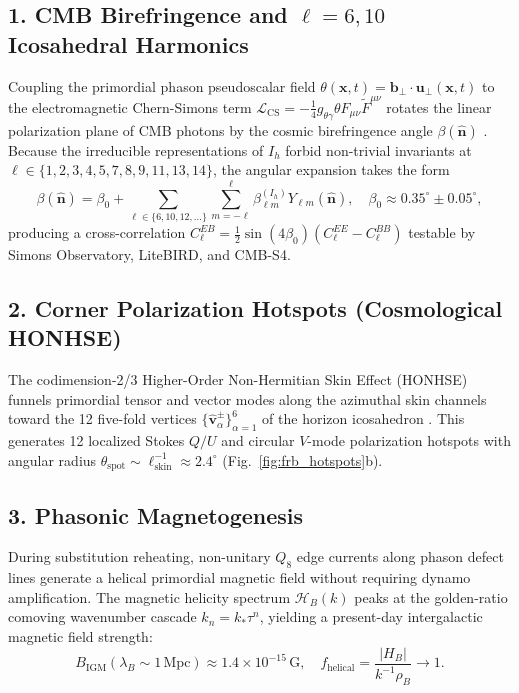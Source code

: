 \documentclass[aps,prd,twocolumn,superscriptaddress,nofootinbib]{revtex4-2}
\begin{document}
\subsection{1. CMB Birefringence and $\ell = 6, 10$ Icosahedral Harmonics}
Coupling the primordial phason pseudoscalar field $\theta(\bm{x}, t) = \bm{b}_\perp \cdot \bm{u}_\perp(\bm{x}, t)$ to the electromagnetic Chern-Simons term $\mathcal{L}_{\mathrm{CS}} = -\frac{1}{4} g_{\theta\gamma} \theta F_{\mu\nu}\tilde{F}^{\mu\nu}$ rotates the linear polarization plane of CMB photons by the cosmic birefringence angle $\beta(\hat{\bm{n}})$ \cite{MinamiKomatsu2020}. Because the irreducible representations of $I_h$ forbid non-trivial invariants at $\ell \in \{1,2,3,4,5,7,8,9,11,13,14\}$, the angular expansion takes the form
\begin{equation}
\beta(\hat{\bm{n}}) = \beta_0 + \sum_{\ell \in \{6, 10, 12, \dots\}} \sum_{m=-\ell}^\ell \beta_{\ell m}^{(I_h)} Y_{\ell m}(\hat{\bm{n}}), \quad \beta_0 \approx 0.35^\circ \pm 0.05^\circ,
\end{equation}
producing a cross-correlation $C_\ell^{EB} = \frac{1}{2}\sin(4\beta_0)(C_\ell^{EE} - C_\ell^{BB})$ testable by Simons Observatory, LiteBIRD, and CMB-S4.

\subsection{2. Corner Polarization Hotspots (Cosmological HONHSE)}
The codimension-2/3 Higher-Order Non-Hermitian Skin Effect (HONHSE) funnels primordial tensor and vector modes along the azimuthal skin channels toward the 12 five-fold vertices $\{\hat{\bm{v}}_\alpha^\pm\}_{\alpha=1}^6$ of the horizon icosahedron \cite{YaoWang2018,Okuma2020}. This generates 12 localized Stokes $Q/U$ and circular $V$-mode polarization hotspots with angular radius $\theta_{\mathrm{spot}} \sim \ell_{\mathrm{skin}}^{-1} \approx 2.4^\circ$ (Fig.~\ref{fig:frb_hotspots}b).

\subsection{3. Phasonic Magnetogenesis}
During substitution reheating, non-unitary $Q_8$ edge currents along phason defect lines generate a helical primordial magnetic field without requiring dynamo amplification. The magnetic helicity spectrum $\mathcal{H}_B(k)$ peaks at the golden-ratio comoving wavenumber cascade $k_n = k_* \tau^n$, yielding a present-day intergalactic magnetic field strength:
\begin{equation}
B_{\mathrm{IGM}}(\lambda_B \sim 1\,\mathrm{Mpc}) \approx 1.4 \times 10^{-15}\,\mathrm{G}, \quad f_{\mathrm{helical}} = \frac{|H_B|}{k^{-1}\rho_B} \to 1.
\end{equation}
\end{document}
